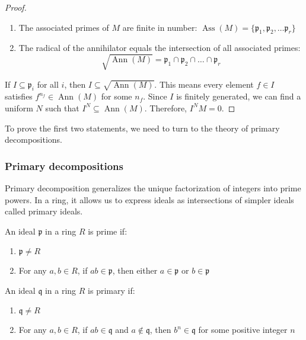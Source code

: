 \documentclass[12pt]{article}
\begin{document}
\begin{proof}
    \begin{enumerate}
        \item The associated primes of $M$ are finite in number: $\operatorname{Ass}(M) = \{{\mathfrak p}_1, {\mathfrak p}_2, \ldots {\mathfrak p}_r\}$

        \item The radical of the annihilator equals the intersection of all associated primes:
              \[\sqrt{\operatorname{Ann}(M)} = {\mathfrak p}_1 \cap {\mathfrak p}_2 \cap \ldots \cap {\mathfrak p}_r\]
    \end{enumerate}
    If $I \subseteq {\mathfrak p}_i$ for all $i$, then $I \subseteq \sqrt{\operatorname{Ann}(M)}$. This means every element $f \in I$ satisfies $f^{n_f} \in \operatorname{Ann}(M)$ for some $n_f$. Since $I$ is finitely generated, we can find a uniform $N$ such that $I^N \subseteq \operatorname{Ann}(M)$. Therefore, $I^N M = 0$.
\end{proof}

To prove the first two statements, we need to turn to the theory of primary decompositions.
\subsubsection{Primary decompositions}
Primary decomposition generalizes the unique factorization of integers into prime powers. In a ring, it allows us to express ideals as intersections of simpler ideals called primary ideals.

\begin{definition}
    An ideal $\mathfrak{p}$ in a ring $R$ is prime if:
    \begin{enumerate}[label=(\roman*)]
        \item $\mathfrak{p} \neq R$
        \item For any $a, b \in R$, if $ab \in \mathfrak{p}$, then either $a \in \mathfrak{p}$ or $b \in \mathfrak{p}$
    \end{enumerate}


    An ideal $\mathfrak{q}$ in a ring $R$ is primary if:
    \begin{enumerate}[label=(\roman*)]
        \item $\mathfrak{q} \neq R$
        \item For any $a, b \in R$, if $ab \in \mathfrak{q}$ and $a \not\in \mathfrak{q}$, then $b^n \in \mathfrak{q}$ for some positive integer $n$
    \end{enumerate}
\end{definition}
\end{document}
